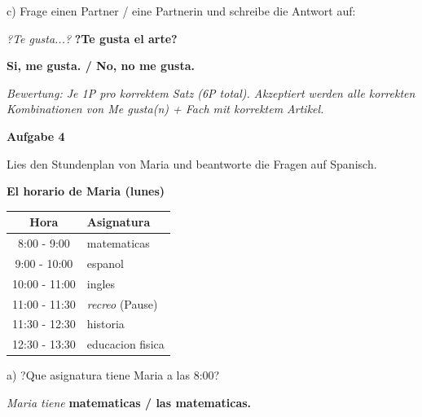 \documentclass[11pt, a4paper]{article}
\newcommand{\fachfarbe}{spanisch}
\newcommand{\punktebox}[1]{\hfill\fbox{\small \_/#1}}
\newcommand{\loesung}[1]{\textcolor{loesung}{\textbf{#1}}}
\newenvironment{aufgabe}[1]{%
    \needspace{5\baselineskip}%
    \nopagebreak[4]%
    \vspace{10pt}
    \noindent\textbf{\textcolor{\fachfarbe}{Aufgabe #1}}
    \nopagebreak[4]%
    \vspace{5pt}
    \nopagebreak[4]%
    \begin{list}{}{\leftmargin=0pt}
    \item[]
}{%
    \end{list}
}
\begin{document}
\vspace{0.5em}

\noindent
c) Frage einen Partner / eine Partnerin und schreibe die Antwort auf:

\noindent
\textit{?Te gusta...?} \loesung{?Te gusta el arte?}

\loesung{Si, me gusta. / No, no me gusta.}

\vspace{0.5em}

\textit{\textcolor{grau}{Bewertung: Je 1P pro korrektem Satz (6P total). Akzeptiert werden alle korrekten Kombinationen von Me gusta(n) + Fach mit korrektem Artikel.}}

\vspace{15pt}


\begin{aufgabe}{4}
Lies den Stundenplan von Maria und beantworte die Fragen auf Spanisch. \punktebox{6}
\end{aufgabe}

\begin{center}
\textbf{El horario de Maria (lunes)}

\vspace{0.5em}

\begin{tabular}{|c|l|}
\hline
\textbf{Hora} & \textbf{Asignatura} \\
\hline
8:00 - 9:00 & matematicas \\
\hline
9:00 - 10:00 & espanol \\
\hline
10:00 - 11:00 & ingles \\
\hline
11:00 - 11:30 & \textit{recreo} (Pause) \\
\hline
11:30 - 12:30 & historia \\
\hline
12:30 - 13:30 & educacion fisica \\
\hline
\end{tabular}
\end{center}

\vspace{0.8em}

\noindent
a) ?Que asignatura tiene Maria a las 8:00?

\noindent
\textit{Maria tiene} \loesung{matematicas / las matematicas.}

\vspace{0.5em}
\end{document}
